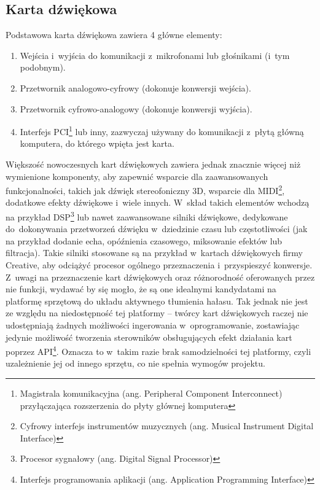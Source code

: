 \subsection{Karta dźwiękowa}
\label{soundcard}
Podstawowa karta dźwiękowa zawiera 4 główne elementy:
\begin{enumerate}
	\item Wejścia i~wyjścia do komunikacji z~mikrofonami lub głośnikami (i~tym podobnym).
	\item Przetwornik analogowo-cyfrowy (dokonuje konwersji wejścia).
	\item Przetwornik cyfrowo-analogowy (dokonuje konwersji wyjścia).
	\item Interfejs PCI\footnote{Magistrala komunikacyjna (ang. Peripheral Component Interconnect) przyłączająca rozszerzenia do płyty głównej komputera} lub inny, zazwyczaj używany do komunikacji z~płytą główną komputera, do którego wpięta jest karta.
\end{enumerate}
Większość nowoczesnych kart dźwiękowych zawiera jednak znacznie więcej niż wymienione komponenty, aby zapewnić wsparcie dla zaawansowanych funkcjonalności, takich jak dźwięk stereofoniczny 3D, wsparcie dla MIDI\footnote{Cyfrowy interfejs instrumentów muzycznych (ang. Musical Instrument Digital Interface)}, dodatkowe efekty dźwiękowe i~wiele innych. W~skład takich elementów wchodzą na przykład DSP\footnote{Procesor sygnałowy (ang. Digital Signal Processor)} lub nawet zaawansowane silniki dźwiękowe, dedykowane do~dokonywania przetworzeń dźwięku w~dziedzinie czasu lub częstotliwości (jak na przykład dodanie echa, opóźnienia czasowego, miksowanie efektów lub filtracja). Takie silniki stosowane są na przykład w~kartach dźwiękowych firmy Creative, aby odciążyć procesor ogólnego przeznaczenia i~przyspieszyć konwersje.\\
Z~uwagi na przeznaczenie kart dźwiękowych oraz różnorodność oferowanych przez nie funkcji, wydawać by się mogło, że są one idealnymi kandydatami na platformę sprzętową do układu aktywnego tłumienia hałasu. Tak jednak nie jest ze względu na niedostępność tej platformy -- twórcy kart dźwiękowych raczej nie udostępniają żadnych możliwości ingerowania w~oprogramowanie, zostawiając jedynie możliwość tworzenia sterowników obsługujących efekt działania kart poprzez API\footnote{Interfejs programowania aplikacji (ang. Application Programming Interface)}. Oznacza to w~takim razie brak samodzielności tej platformy, czyli uzależnienie jej od innego sprzętu, co nie spełnia wymogów projektu.
